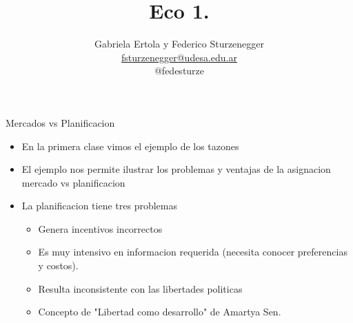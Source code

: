 \documentclass{beamer}
\title[Escuela de Negocios]{Eco 1. }
\date{}
\author[Federico Sturzenegger]{Gabriela Ertola y Federico Sturzenegger  \\
\vspace{0.4cm}
\href{mailto:fsturzenegger@udesa.edu.ar}{fsturzenegger@udesa.edu.ar}   \\
\vspace{0.2cm}
\small{ \faTwitter \quad @fedesturze}}
\institute[]{Universidad de San Andrés \\
2022}
\begin{document}

\begin{frame}
  \titlepage
\end{frame}















\begin{frame}{Mercados vs Planificacion}
    
    \begin{itemize}
        \item En la primera clase vimos el ejemplo de los tazones
        \item El ejemplo nos permite ilustrar los problemas y ventajas de la asignacion mercado vs planificacion
        \item La planificacion tiene tres problemas
        \begin{itemize}
            \item Genera incentivos incorrectos 
            \item Es muy intensivo en informacion requerida (necesita conocer preferencias y costos).
            \item Resulta inconsistente con las libertades politicas
            \item Concepto de "Libertad como desarrollo" de Amartya Sen. 
        \end{itemize}
    \end{itemize}
    
    
\end{frame}
\end{document}
